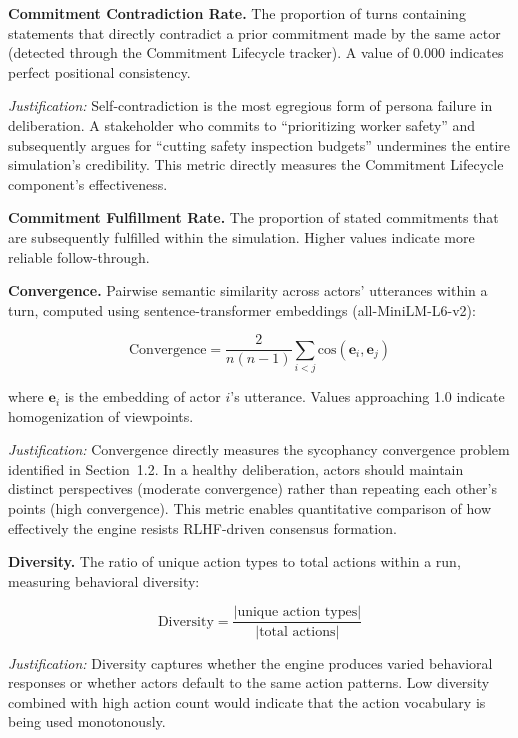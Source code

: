\textbf{Commitment Contradiction Rate.} The proportion of turns containing statements that directly contradict a prior commitment made by the same actor (detected through the Commitment Lifecycle tracker). A value of 0.000 indicates perfect positional consistency.

\textit{Justification:} Self-contradiction is the most egregious form of persona failure in deliberation. A stakeholder who commits to ``prioritizing worker safety'' and subsequently argues for ``cutting safety inspection budgets'' undermines the entire simulation's credibility. This metric directly measures the Commitment Lifecycle component's effectiveness.

\textbf{Commitment Fulfillment Rate.} The proportion of stated commitments that are subsequently fulfilled within the simulation. Higher values indicate more reliable follow-through.

\textbf{Convergence.} Pairwise semantic similarity across actors' utterances within a turn, computed using sentence-transformer embeddings (all-MiniLM-L6-v2):

\begin{equation}
    \text{Convergence} = \frac{2}{n(n-1)} \sum_{i < j} \text{cos}(\mathbf{e}_i, \mathbf{e}_j)
    \label{eq:convergence}
\end{equation}

\noindent where $\mathbf{e}_i$ is the embedding of actor $i$'s utterance. Values approaching 1.0 indicate homogenization of viewpoints.

\textit{Justification:} Convergence directly measures the sycophancy convergence problem identified in Section~1.2. In a healthy deliberation, actors should maintain distinct perspectives (moderate convergence) rather than repeating each other's points (high convergence). This metric enables quantitative comparison of how effectively the engine resists RLHF-driven consensus formation.

\textbf{Diversity.} The ratio of unique action types to total actions within a run, measuring behavioral diversity:

\begin{equation}
    \text{Diversity} = \frac{|\text{unique action types}|}{|\text{total actions}|}
    \label{eq:diversity}
\end{equation}

\textit{Justification:} Diversity captures whether the engine produces varied behavioral responses or whether actors default to the same action patterns. Low diversity combined with high action count would indicate that the action vocabulary is being used monotonously.


